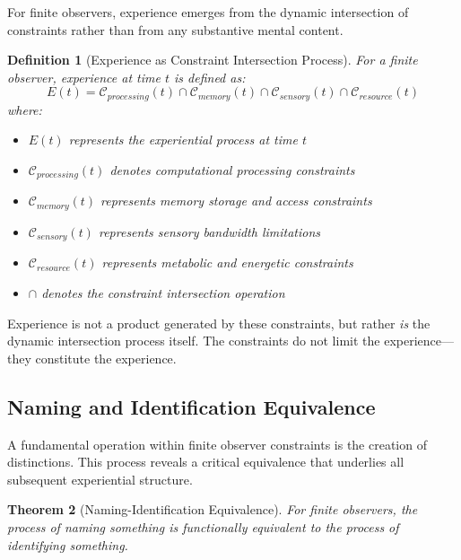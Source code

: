 \documentclass{article}
\newtheorem{theorem}{Theorem}[section]
\newtheorem{definition}[theorem]{Definition}
\begin{document}
For finite observers, experience emerges from the dynamic intersection of constraints rather than from any substantive mental content.

\begin{definition}[Experience as Constraint Intersection Process]
For a finite observer, experience at time $t$ is defined as:
\begin{equation}
E(t) = \mathcal{C}_{processing}(t) \cap \mathcal{C}_{memory}(t) \cap \mathcal{C}_{sensory}(t) \cap \mathcal{C}_{resource}(t)
\end{equation}
where:
\begin{itemize}
\item $E(t)$ represents the experiential process at time $t$
\item $\mathcal{C}_{processing}(t)$ denotes computational processing constraints
\item $\mathcal{C}_{memory}(t)$ represents memory storage and access constraints  
\item $\mathcal{C}_{sensory}(t)$ represents sensory bandwidth limitations
\item $\mathcal{C}_{resource}(t)$ represents metabolic and energetic constraints
\item $\cap$ denotes the constraint intersection operation
\end{itemize}
\end{definition}

Experience is not a product generated by these constraints, but rather \textit{is} the dynamic intersection process itself. The constraints do not limit the experience—they constitute the experience.

\subsection{Naming and Identification Equivalence}

A fundamental operation within finite observer constraints is the creation of distinctions. This process reveals a critical equivalence that underlies all subsequent experiential structure.

\begin{theorem}[Naming-Identification Equivalence]
For finite observers, the process of naming something is functionally equivalent to the process of identifying something.
\end{theorem}
\end{document}

